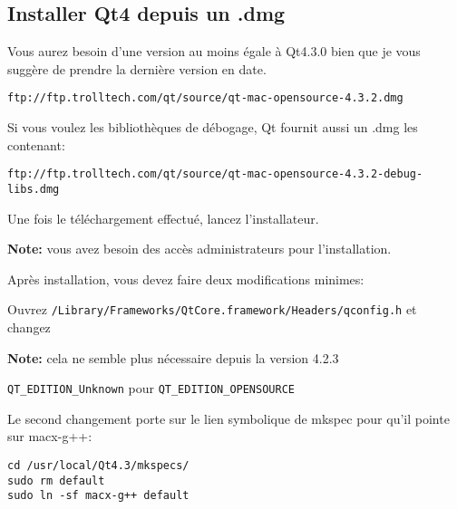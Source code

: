 \subsection{Installer Qt4 depuis un .dmg}
Vous aurez besoin d'une version au moins égale à Qt4.3.0 bien que je vous suggère de prendre la dernière version en date.

\begin{verbatim}
ftp://ftp.trolltech.com/qt/source/qt-mac-opensource-4.3.2.dmg
\end{verbatim}

Si vous voulez les bibliothèques de débogage, Qt fournit aussi un .dmg les contenant:

\begin{verbatim}
ftp://ftp.trolltech.com/qt/source/qt-mac-opensource-4.3.2-debug-libs.dmg
\end{verbatim}

Une fois le téléchargement effectué, lancez l'installateur.

% 
% 
% 
% 
% 
% 

\textbf{Note:} vous avez besoin des accès administrateurs pour l'installation.

Après installation, vous devez faire deux modifications minimes:

Ouvrez \texttt{/Library/Frameworks/QtCore.framework/Headers/qconfig.h} et changez

\textbf{Note:} cela ne semble plus nécessaire depuis la version 4.2.3

\texttt{QT\_EDITION\_Unknown} pour \texttt{QT\_EDITION\_OPENSOURCE}

Le second changement porte sur le lien symbolique de mkspec pour qu'il pointe sur macx-g++:

\begin{verbatim}
cd /usr/local/Qt4.3/mkspecs/ 
sudo rm default 
sudo ln -sf macx-g++ default
\end{verbatim}

